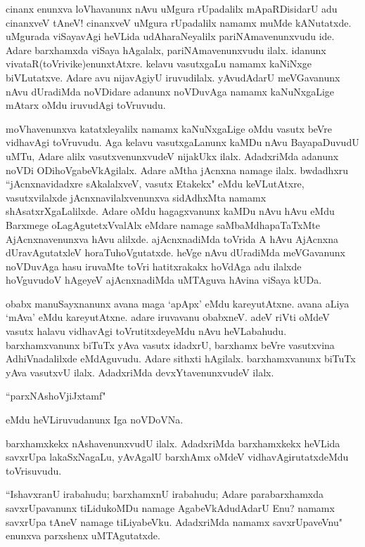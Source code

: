 cinanx enunxva loVhavanunx nAvu uMgura rUpadalilx mApaRDisidarU adu cinanxveV tAneV! cinanxveV uMgura rUpadalilx namamx muMde kANutatxde. uMgurada viSayavAgi heVLida udAharaNeyalilx pariNAmavenunxvudu ide. Adare barxhamxda viSaya hAgalalx, pariNAmavenunxvudu ilalx. idanunx vivataR(toVrivike)enunxtAtxre. kelavu vasutxgaLu namamx kaNiNxge biVLutatxve. Adare avu nijavAgiyU iruvudilalx. yAvudAdarU meVGavanunx nAvu dUradiMda noVDidare adanunx noVDuvAga namamx kaNuNxgaLige mAtarx oMdu iruvudAgi toVruvudu.

moVhavenunxva katatxleyalilx namamx kaNuNxgaLige oMdu vasutx beVre vidhavAgi toVruvudu. Aga kelavu vasutxgaLanunx kaMDu nAvu BayapaDuvudU uMTu, Adare alilx vasutxvenunxvudeV nijakUkx ilalx. AdadxriMda adanunx noVDi ODihoVgabeVkAgilalx. Adare aMtha jAcnxna namage ilalx. bwdadhxru ``jAcnxnavidadxre sAkalalxveV, vasutx Etakekx" eMdu keVLutAtxre, vasutxvilalxde jAcnxnavilalxvenunxva sidAdhxMta namamx shAsatxrXgaLalilxde. Adare oMdu hagagxvanunx kaMDu nAvu hAvu eMdu Barxmege oLagAgutetxVvalAlx eMdare namage saMbaMdhapaTaTxMte AjAcnxnavenunxva hAvu alilxde. ajAcnxnadiMda toVrida A hAvu AjAcnxna dUravAgutatxleV horaTuhoVgutatxde. heVge nAvu dUradiMda meVGavanunx noVDuvAga hasu iruvaMte toVri hatitxrakakx hoVdAga adu ilalxde hoVguvudoV hAgeyeV ajAcnxnadiMda uMTAguva hAvina viSaya kUDa. 


obabx manuSayxnanunx avana maga `apApx' eMdu kareyutAtxne. avana aLiya `mAva' eMdu kareyutAtxne. adare iruvavanu obabxneV. adeV riVti oMdeV vasutx halavu vidhavAgi toVrutitxdeyeMdu nAvu heVLabahudu. barxhamxvanunx biTuTx yAva vasutx idadxrU, barxhamx beVre vasutxvina AdhiVnadalilxde eMdAguvudu. Adare sithxti hAgilalx. barxhamxvanunx biTuTx yAva vasutxvU ilalx. AdadxriMda devxYtavenunxvudeV ilalx. 

\begin{shloka}
``parxNAshoVjiJxtamf"
\end{shloka}

eMdu heVLiruvudanunx Iga noVDoVNa.

barxhamxkekx nAshavenunxvudU ilalx. AdadxriMda barxhamxkekx heVLida savxrUpa lakaSxNagaLu, yAvAgalU barxhAmx oMdeV vidhavAgirutatxdeMdu toVrisuvudu. 

``IshavxranU irabahudu; barxhamxnU irabahudu; Adare parabarxhamxda savxrUpavanunx tiLidukoMDu namage AgabeVkAdudAdarU Enu? namamx savxrUpa tAneV namage tiLiyabeVku. AdadxriMda namamx savxrUpaveVnu" enunxva parxshenx uMTAgutatxde. 

